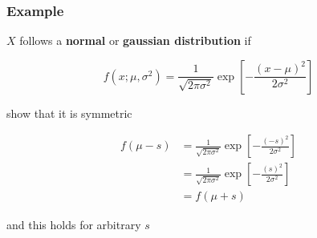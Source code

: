 \documentclass{beamer}
\begin{document}



\begin{frame}
\frametitle{Example}

$X$ follows a \textbf{normal} or \textbf{gaussian distribution} if 

\[
f(x; \mu, \sigma^2)  = \frac{1}{ \sqrt{2 \pi \sigma^2} } \exp \left[ - \frac{(x - \mu)^2}{2 \sigma^2} \right]
\]

show that it is symmetric 
\pause

\begin{align*}
f(\mu - s) &= \frac{1}{ \sqrt{2 \pi \sigma^2} } \exp \left[ -\frac{(-s)^2}{2 \sigma^2} \right] \\
&= \frac{1}{ \sqrt{2 \pi \sigma^2} } \exp \left[ -\frac{(s)^2}{2 \sigma^2} \right] \\
&= f(\mu + s)
\end{align*}

and this holds for arbitrary $s$
\end{frame}

\end{document}
